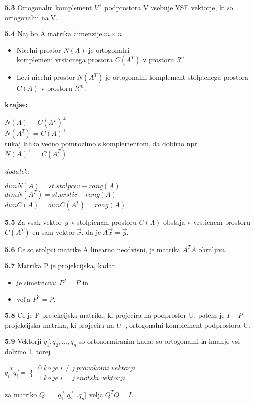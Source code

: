 \documentclass{article}
\begin{document}
\begin{multicols}{2}
	\textbf{5.3} Ortogonalni komplement $V^{\perp}$ podprostora V vsebuje VSE vektorje, ki so ortogonalni na V.

	\textbf{5.4} Naj bo A matrika dimenzije $m \times n$.
	\begin{itemize}
		\item Nicelni prostor $N(A)$ je ortogonalni\\ komplement vrsticnega prostora $C(A^{T})$ v prostoru $R^{n}$
		\item Levi nicelni prostor $N(A^{T})$ je ortogonalni komplement stolpicnega prostora $C(A)$ v prostoru $R^{m}$.
	\end{itemize}
	\textbf{krajse:}
	\begin{center}
		$N(A)$ = $C(A^{T})^{\perp}$\\
		$N(A^{T})$ = $C(A)^{\perp}$ \\
		tukaj lahko vedno pomnozimo s komplementom, da dobimo npr.\\
		$N(A)^{\perp}$ = $C(A^{T})$
	\end{center}
	\textit{dodatek:}
	\begin{center}
		$dim N(A) = st. stolpcev - rang(A)$\\
		$dim N(A^{T}) = st. vrstic - rang(A)$\\
		$dim C(A) = dim C(A^{T}) = rang(A)$
	\end{center}

	\textbf{5.5} Za vsak vektor $\vec{y}$ v stolpicnem prostoru $C(A)$ obstaja v vrsticnem prostoru $C(A^{T})$ en sam
	vektor $\vec{x}$, da je $A\vec{x} = \vec{y}$.

	\textbf{5.6} Ce so stolpci matrike A linearno neodvisni, je matrika $A^{T}A$ obrnljiva.

	\textbf{5.7} Matrika P je projekcijska, kadar
	\begin{itemize}
		\item je simetricna: $P^{T} = P$ in
		\item velja $P^{2} = P$.
	\end{itemize}

	\textbf{5.8} Ce je P projekcijska matrika, ki projecira na podprostor U, potem je $I -P$ projekcijska
	matrika, ki projecira na $U^{\perp}$, ortogonalni komplement podprostora U.

	\textbf{5.9} Vektorji $\vec{q_{1}}, \vec{q_{2}}, \dots, \vec{q_{n}}$ so ortonormiranim kadar so ortogonalni in imanjo vsi
	dolzino 1, torej
	\begin{center}
		$\vec{q_{i}}^{T}\vec{q_{i}} = $ \Bigg\{
		$\begin{matrix}
				0\;  ko\; je\; i \neq j\; pravokotni\; vektorji \\
				1\;  ko\; je\; i = j\; enotski\; vektorji
			\end{matrix}$
	\end{center}
	za matriko $Q =$ [$\vec{q_{1}}, \vec{q_{2}} \dots \vec{q_{n}}$]  velja $Q^{T}Q = I$.


\end{multicols}
\end{document}
